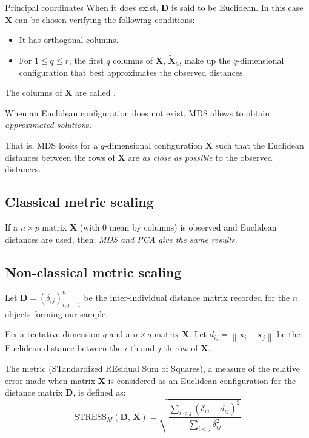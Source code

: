 \begin{definition}{Principal coordinates}
When it does exist, $\boldsymbol{D}$ is said to be Euclidean. In this
case $\boldsymbol{X}$ can be chosen verifying the following conditions:
\begin{itemize}
	\item It has orthogonal columns.
	\item For $1 \leq q \leq r$, the first $q$ columns of $\boldsymbol{X}$,
	      $\boldsymbol{\tilde{X}}_a$, make up the $q$-dimensional configuration that
	      best approximates the observed distances.
\end{itemize}
The columns of $\boldsymbol{X}$ are called .

\tcblower

\begin{note}
When an Euclidean configuration does not exist, MDS allows to
obtain \emph{approximated solution}s.

That is, MDS looks for a $q$-dimensional
configuration $\boldsymbol{X}$ such that the Euclidean distances between
the rows of $\boldsymbol{X}$ are \emph{as close as possible} to the observed
distances.
\end{note}
\end{definition}


\subsection{Classical metric scaling}

If a $n \times p$ matrix $\boldsymbol{X}$ (with 0 mean by columns) is observed
and Euclidean distances are used, then: \emph{MDS and PCA give the same results}.

\subsection{Non-classical metric scaling}%
\label{sec:non-classical-metric-scaling}

Let $\boldsymbol{D} = (\delta_{ij})^n_{i,j=1}$ be the inter-individual distance
matrix recorded for the $n$ objects forming our sample.

Fix a tentative dimension $q$ and a $n \times q$ matrix $\boldsymbol{X}$.
Let $d_{ij} = \left\lVert \boldsymbol{x}_i - \boldsymbol{x}_j \right\rVert$ be the
Euclidean distance between the $i$-th and $j$-th row of $\boldsymbol{X}$.

The metric  (STandardized REsidual Sum of Squares), a measure
of the relative error made when matrix $\boldsymbol{X}$ is considered as
an Euclidean configuration for the distance matrix $\boldsymbol{D}$, is defined as:
\begin{equation*}
	\text{STRESS}_M(\boldsymbol{D},\, \boldsymbol{X}) = \sqrt{\frac
		{\sum_{i<j}(\delta_{ij} - d_{ij})^2}
		{\sum_{i<j}\delta_{ij}^2}
	}
\end{equation*}

